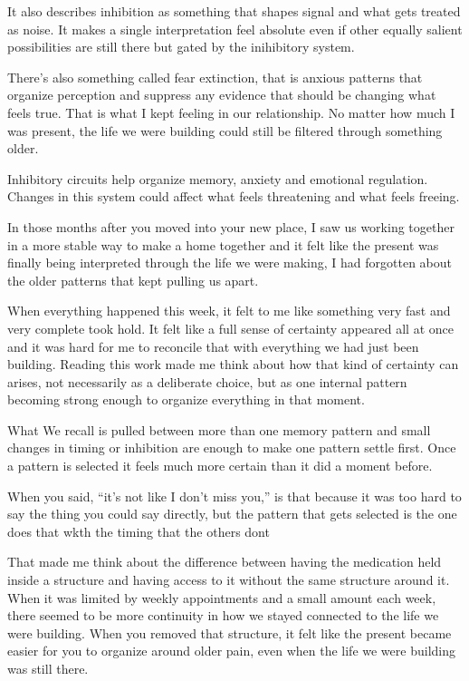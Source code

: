 \documentclass[10pt,twocolumn]{article}
\begin{document}
It also describes inhibition as something that shapes signal and what gets treated as noise. It makes a single interpretation feel absolute even if other equally salient possibilities are still there but gated by the inihibitory system.

There's also something called fear extinction, that is anxious patterns that organize perception and suppress any evidence that should be changing what feels true. That is what I kept feeling in our relationship. No matter how much I was present, the life we were building could still be filtered through something older.

Inhibitory circuits help organize memory, anxiety and emotional regulation. Changes in this system could affect what feels threatening and what feels freeing.

In those months after you moved into your new place, I saw us working together in a more stable way to make a home together and it felt like the present was finally being interpreted through the life we were making, I had forgotten about the older patterns that kept pulling us apart.

When everything happened this week, it felt to me like something very fast and very complete took hold. It felt like a full sense of certainty appeared all at once and it was hard for me to reconcile that with everything we had just been building. Reading this work made me think about how that kind of certainty can arises, not necessarily as a deliberate choice, but as one internal pattern becoming strong enough to organize everything in that moment.

What We recall is pulled between more than one memory pattern and small changes in timing or inhibition are enough to make one pattern settle first. Once a pattern is selected it feels much more certain than it did a moment before.

When you said, ``it's not like I don't miss you,'' is that because it was too hard to say the thing you could say directly, but the pattern that gets selected is the one does that wkth the timing that the others dont

That made me think about the difference between having the medication held inside a structure and having access to it without the same structure around it. When it was limited by weekly appointments and a small amount each week, there seemed to be more continuity in how we stayed connected to the life we were building. When you removed that structure, it felt like the present became easier for you to organize around older pain, even when the life we were building was still there.
\end{document}
